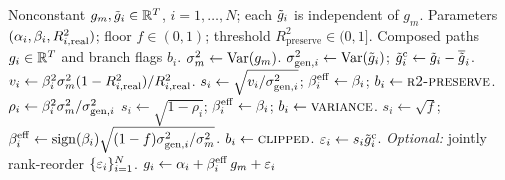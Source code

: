 \begin{algorithm}[t]
\caption{Hybrid single-index model (SIM) composition with variance correction.}
\label{alg:hybrid}
\small
\begin{algorithmic}[1]
  \REQUIRE Nonconstant $g_m,\tilde{g}_i\in\mathbb{R}^T$, $i=1,\dots,N$; each
    $\tilde{g}_i$ is independent of $g_m$.
  \REQUIRE Parameters $(\alpha_i,\beta_i,R^2_{i,\mathrm{real}})$; floor
    $f\in(0,1)$; threshold $R^2_{\mathrm{preserve}}\in(0,1]$.
  \ENSURE Composed paths $g_i\in\mathbb{R}^T$ and branch flags $b_i$.
  \STATE $\sigma_m^2 \gets \operatorname{Var}(g_m)$.
    \STATE $\sigma_{\mathrm{gen},i}^2 \gets \operatorname{Var}(\tilde{g}_i)$;
      $\tilde{g}_i^{\mathrm c} \gets \tilde{g}_i-\overline{\tilde{g}}_i$.
      \STATE $v_i \gets \beta_i^2\sigma_m^2(1-R^2_{i,\mathrm{real}})/R^2_{i,\mathrm{real}}$.
      \STATE $s_i \gets \sqrt{v_i/\sigma_{\mathrm{gen},i}^2}$;
        $\beta_i^{\mathrm{eff}} \gets \beta_i$; $b_i\gets\textsc{r2-preserve}$.
    \ELSE
      \STATE $\rho_i \gets \beta_i^2 \sigma_m^2 / \sigma_{\mathrm{gen},i}^2$
        \STATE $s_i \gets \sqrt{1-\rho_i}$;
          $\beta_i^{\mathrm{eff}}\gets\beta_i$; $b_i\gets\textsc{variance}$.
      \ELSE
        \STATE $s_i\gets\sqrt{f}$;
          $\beta_i^{\mathrm{eff}}\gets\operatorname{sign}(\beta_i)
          \sqrt{(1-f)\sigma_{\mathrm{gen},i}^2/\sigma_m^2}$.
        \STATE $b_i\gets\textsc{clipped}$.
      \ENDIF
    \ENDIF
    \STATE $\varepsilon_i \gets s_i\tilde{g}_i^{\mathrm c}$.
  \ENDFOR
  \STATE \textit{Optional:} jointly rank-reorder $\{\varepsilon_i\}_{i=1}^{N}$.
    \STATE $g_i \gets \alpha_i + \beta_i^{\mathrm{eff}}\, g_m + \varepsilon_i$
      \hfill {}
  \ENDFOR
\end{algorithmic}
\end{algorithm}

